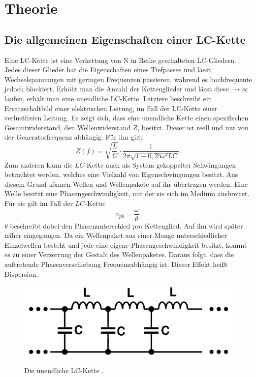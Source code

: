 
\section{Theorie}
\label{sec:Theorie}

\subsection{Die allgemeinen Eigenschaften einer LC-Kette}
Eine LC-Kette ist eine Verkettung von N in Reihe geschalteten LC-Gliedern.
 Jedes dieser Glieder hat die Eigenschaften eines Tiefpasses und lässt
  Wechselspannungen mit geringen Frequenzen passieren, während es hochfrequente jedoch
   blockiert. Erhöht man die Anzahl der Kettenglieder und lässt
   diese $\to \infty$ laufen, erhält man eine unendliche LC-Kette. Letztere
    beschreibt ein Ersatzschaltbild einer elektrischen Leitung, im Fall der
     LC-Kette einer verlustfreien Leitung. Es zeigt sich, dass eine unendliche
      Kette einen spezifischen Gesamtwiderstand, den Wellenwiderstand $Z$, besitzt.
      Dieser ist reell und nur von der Generatorfrequenz abhängig. Für ihn gilt:
      \begin{equation}
        Z(f) = \sqrt{\frac{L}{C}} \cdot \frac{1}{2\pi \sqrt{1-0,25\omega² LC}}\text{.}
      \end{equation}
 Zum anderen kann die $LC$-Kette auch als System gekoppelter
    Schwingungen betrachtet werden, welches eine Vielzahl von Eigenschwingungen besitzt.
      Aus diesem Grund können Wellen und Wellenpakete auf ihr übertragen werden.
	Eine Welle besitzt eine Phasengeschwindigkeit, mit der sie sich im Medium ausbreitet. Für sie gilt im Fall der $LC$-Kette:
\begin{equation}
v_{ph} = \frac{\omega}{\theta}\text{.}
\end{equation}
	$\theta$ beschreibt dabei den Phasenunterschied pro Kettenglied. Auf ihn wird später näher eingegangen.
     Da ein Wellenpaket aus einer Menge unterschiedlicher Einzelwellen besteht
      und jede eine eigene Phasengeschwindigkeit besitzt, kommt es zu einer Verzerrung
  der Gestalt des Wellenpaketes. Daraus folgt, dass die auftretende Phasenverschiebung Frequenzabhängig ist.
   Dieser Effekt heißt Dispersion.
     \begin{figure}[H]
       \centering
       \includegraphics[width=\linewidth-200pt,height=\textheight-200pt,keepaspectratio]{content/Grafiken/LCKette.png}
       \caption{Die unendliche LC-Kette \cite{V356}.}
       \label{fig:LC-Kette}
     \end{figure}

